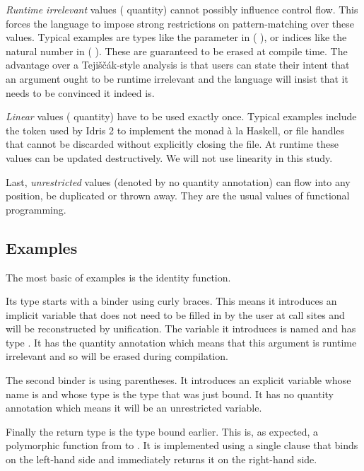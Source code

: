 \documentclass{article}
\newcommand{\idris}{Idris 2}
\begin{document}
\emph{Runtime irrelevant} values ( quantity) cannot possibly influence
control flow.
%
This forces the language to impose strong restrictions on pattern-matching over these
values.
%
Typical examples are types like the  parameter in ( ),
or indices like the natural number  in
(  ).
%
These are guaranteed to be erased at compile time. The advantage over a Tejiščák-style
analysis is that users can state their intent that an argument ought to be runtime
irrelevant and the language will insist that it needs to be convinced it indeed is.

\emph{Linear} values ( quantity) have to be used exactly once.
%
Typical examples include the  token used by \idris{} to implement the
 monad à la Haskell, or file handles that cannot be discarded without explicitly
closing the file.
%
At runtime these values can be updated destructively. We will not use linearity in this study.

Last, \emph{unrestricted} values (denoted by no quantity annotation) can flow into any
position, be duplicated or thrown away. They are the usual values of functional programming.

\subsection{Examples}

The most basic of examples is the identity function.


Its type starts with a binder using curly braces. This means it introduces an implicit
variable that does not need to be filled in by the user at call sites and will be
reconstructed by unification. The variable it introduces is named  and
has type . It has the  quantity annotation which means
that this argument is runtime irrelevant and so will be erased during compilation.

The second binder is using parentheses. It introduces an explicit variable whose name
is  and whose type is the type  that was just bound. It has
no quantity annotation which means it will be an unrestricted variable.

Finally the return type is the type  bound earlier. This is, as expected,
a polymorphic function from  to . It is implemented using
a single clause that binds  on the left-hand side and immediately returns
it on the right-hand side.
\end{document}
